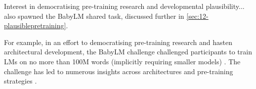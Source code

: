 Interest in democratising pre-training research and developmental plausibility... also spawned the BabyLM shared task, discussed further in \cref{sec:12-plausiblepretraining}.

For example, in an effort to democratising pre-training research and hasten architectural development, the BabyLM challenge challenged participants to train LMs on no more than 100M words (implicitly requiring smaller models) \citep{warstadt2023findings}. The challenge has led to numerous insights across architectures \citep{charpentier2024bert} and pre-training strategies \citep{martinez-etal-2023-climb}. 





